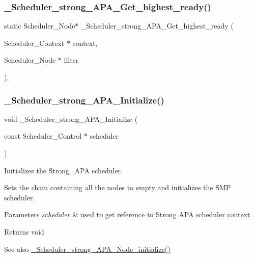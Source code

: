 \subsubsection{\texorpdfstring{\+\_\+\+Scheduler\+\_\+strong\+\_\+\+A\+P\+A\+\_\+\+Get\+\_\+highest\+\_\+ready()}{\_Scheduler\_strong\_APA\_Get\_highest\_ready()}}
{\footnotesize\ttfamily static Scheduler\+\_\+\+Node$\ast$ \+\_\+\+Scheduler\+\_\+strong\+\_\+\+A\+P\+A\+\_\+\+Get\+\_\+highest\+\_\+ready (\begin{DoxyParamCaption}\item[{Scheduler\+\_\+\+Context $\ast$}]{context,  }\item[{Scheduler\+\_\+\+Node $\ast$}]{filter }\end{DoxyParamCaption})\hspace{0.3cm}{\ttfamily [inline]}, {\ttfamily [static]}}

\mbox{\label{group__RTEMSScoreSchedulerStrongAPA_gafcd6fde337d7542784698219322b6365}} 
\subsubsection{\texorpdfstring{\+\_\+\+Scheduler\+\_\+strong\+\_\+\+A\+P\+A\+\_\+\+Initialize()}{\_Scheduler\_strong\_APA\_Initialize()}}
{\footnotesize\ttfamily void \+\_\+\+Scheduler\+\_\+strong\+\_\+\+A\+P\+A\+\_\+\+Initialize (\begin{DoxyParamCaption}\item[{const Scheduler\+\_\+\+Control $\ast$}]{scheduler }\end{DoxyParamCaption})}



Initializes the Strong\+\_\+\+A\+PA scheduler. 

Sets the chain containing all the nodes to empty and initializes the S\+MP scheduler.


\begin{DoxyParams}{Parameters}
{\em scheduler} & used to get reference to Strong A\+PA scheduler context \\
\hline
\end{DoxyParams}
\begin{DoxyReturn}{Returns}
void 
\end{DoxyReturn}
\begin{DoxySeeAlso}{See also}
\hyperlink{group__RTEMSScoreSchedulerStrongAPA_ga1cde4345d4dc0b5a37a696fa446bb47e}{\+\_\+\+Scheduler\+\_\+strong\+\_\+\+A\+P\+A\+\_\+\+Node\+\_\+initialize()} 
\end{DoxySeeAlso}


